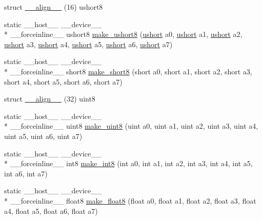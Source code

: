 \begin{DoxyCompactItemize}
\item 
struct \hyperlink{namespacecv_1_1gpu_1_1device_a3fed59ae9a2b88f5e6810f4332f983a8}{\-\_\-\-\_\-align\-\_\-\-\_\-} (16) ushort8
\item 
static \-\_\-\-\_\-host\-\_\-\-\_\- \-\_\-\-\_\-device\-\_\-\-\_\- \\*
\-\_\-\-\_\-forceinline\-\_\-\-\_\- ushort8 \hyperlink{namespacecv_1_1gpu_1_1device_a9fa6c9f03b8a26e02ad596ec188c546a}{make\-\_\-ushort8} (\hyperlink{core_2types__c_8h_ab95f123a6c9bcfee6a343170ef8c5f69}{ushort} a0, \hyperlink{core_2types__c_8h_ab95f123a6c9bcfee6a343170ef8c5f69}{ushort} a1, \hyperlink{core_2types__c_8h_ab95f123a6c9bcfee6a343170ef8c5f69}{ushort} a2, \hyperlink{core_2types__c_8h_ab95f123a6c9bcfee6a343170ef8c5f69}{ushort} a3, \hyperlink{core_2types__c_8h_ab95f123a6c9bcfee6a343170ef8c5f69}{ushort} a4, \hyperlink{core_2types__c_8h_ab95f123a6c9bcfee6a343170ef8c5f69}{ushort} a5, \hyperlink{core_2types__c_8h_ab95f123a6c9bcfee6a343170ef8c5f69}{ushort} a6, \hyperlink{core_2types__c_8h_ab95f123a6c9bcfee6a343170ef8c5f69}{ushort} a7)
\item 
static \-\_\-\-\_\-host\-\_\-\-\_\- \-\_\-\-\_\-device\-\_\-\-\_\- \\*
\-\_\-\-\_\-forceinline\-\_\-\-\_\- short8 \hyperlink{namespacecv_1_1gpu_1_1device_a93d1122b867cc4b335469c22424d1c4d}{make\-\_\-short8} (short a0, short a1, short a2, short a3, short a4, short a5, short a6, short a7)
\item 
struct \hyperlink{namespacecv_1_1gpu_1_1device_aabdc5ba76ff95d501a031b01e6af98cc}{\-\_\-\-\_\-align\-\_\-\-\_\-} (32) uint8
\item 
static \-\_\-\-\_\-host\-\_\-\-\_\- \-\_\-\-\_\-device\-\_\-\-\_\- \\*
\-\_\-\-\_\-forceinline\-\_\-\-\_\- uint8 \hyperlink{namespacecv_1_1gpu_1_1device_ac86790f2fa291f037c5b2670bdb21cbe}{make\-\_\-uint8} (uint a0, uint a1, uint a2, uint a3, uint a4, uint a5, uint a6, uint a7)
\item 
static \-\_\-\-\_\-host\-\_\-\-\_\- \-\_\-\-\_\-device\-\_\-\-\_\- \\*
\-\_\-\-\_\-forceinline\-\_\-\-\_\- int8 \hyperlink{namespacecv_1_1gpu_1_1device_aaf5e991b71466051c9cd6c3130db82e8}{make\-\_\-int8} (int a0, int a1, int a2, int a3, int a4, int a5, int a6, int a7)
\item 
static \-\_\-\-\_\-host\-\_\-\-\_\- \-\_\-\-\_\-device\-\_\-\-\_\- \\*
\-\_\-\-\_\-forceinline\-\_\-\-\_\- float8 \hyperlink{namespacecv_1_1gpu_1_1device_a5031c14a646afb2ae919d4b6e6044c19}{make\-\_\-float8} (float a0, float a1, float a2, float a3, float a4, float a5, float a6, float a7)

\end{DoxyCompactItemize}
